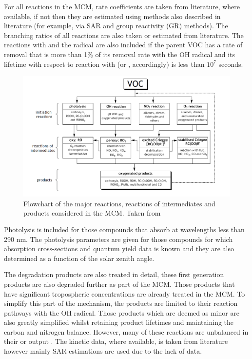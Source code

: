 For all reactions in the MCM, rate coefficients are taken from literature, where available, if not then they are estimated 
using methods also described in literature (for example, via SAR and group reactivity (GR) methods). The branching ratios of 
all reactions are also taken or estimated from literature. The reactions with  and the  radical are also 
included if the parent VOC has a rate of removal that is more than 1\% of its removal rate with the OH radical and its lifetime
with respect to reaction with  (or , accordingly) is less than $10^7$ seconds.
\begin{figure}[ht]
    \begin{center}
        \includegraphics[width=13cm]{../img/MCM_scheme.png}
        \caption{Flowchart of the major reactions, reactions of intermediates and products considered in the MCM. Taken from \citep{Saunders:2003}}
        \label{f:MCM_scheme}
    \end{center}
\end{figure}

Photolysis is included for those compounds that absorb at wavelengths less than 290 nm. The photolysis parameters are given for
those  compounds for which absorption cross-sections and quantum yield data is known and they are also determined as a function
of the solar zenith angle. 

The degradation products are also treated in detail, these first generation products are also degraded further as part of the 
MCM. Those products that have significant tropospheric concentrations are already treated in the MCM. To simplify this part of 
the mechanism, the products are limited to their reaction pathways with the OH radical. Those products which are deemed as 
minor are also greatly simplified whilst retaining product lifetimes and maintaining the carbon and nitrogen balance. However, 
many of these reactions are unbalanced in their  or  output \citep{Jenkin:1997}. The kinetic data, where 
available, is taken from literature however mainly SAR estimations are used due to the lack of data.

